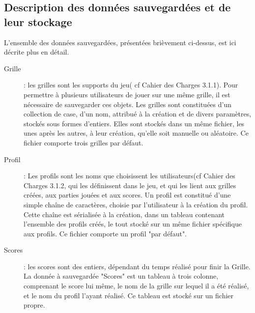 \documentclass[11pt]{article}
\begin{document}
\subsection{Description des données sauvegardées et de leur stockage}
L'ensemble des données sauvegardées, présentées brièvement ci-dessus, est ici décrite plus en détail.

\begin{description}
    \item [Grille] : les grilles sont les supports du jeu( cf Cahier des Charges 3.1.1). Pour permettre à plusieurs utilisateurs de jouer sur une même grille, il est nécessaire de sauvegarder ces objets. Les grilles sont constituées d'un collection de case, d'un nom, attribué à la création et de divers paramètres, stockés sous formes d'entiers. Elles sont stockés dans un même fichier, les unes après les autres, à leur création, qu'elle soit manuelle ou aléatoire. Ce fichier comporte trois grilles par défaut.
    \item [Profil] : Les profils sont les noms que choisissent les utilisateurs(cf Cahier des Charges 3.1.2, qui les définissent dans le jeu, et qui les lient aux grilles créées, aux parties jouées et aux scores. Un profil est constitué d'une simple chaîne de caractères, choisie par l'utilisateur à la création du profil. Cette chaîne est sérialisée à la création, dans un tableau contenant l'ensemble des profils créés, le tout stocké sur un même fichier spécifique aux profils. Ce fichier comporte un profil "par défaut".
    \item [Scores] : les scores sont des entiers, dépendant du temps réalisé pour finir la Grille. La donnée à sauvegardée "Scores" est un tableau à trois colonne, comprenant le score lui même, le nom de la grille sur lequel il a été réalisé, et le nom du profil l'ayant réalisé. Ce tableau est stocké sur un fichier propre.

\end{description}
\end{document}
